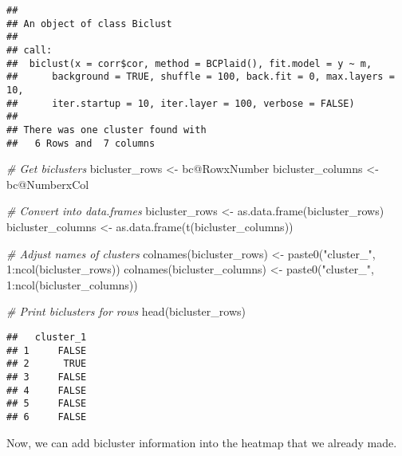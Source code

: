 \documentclass[
  oneside]{book}
\newenvironment{Shaded}{\begin{snugshade}}{\end{snugshade}}
\newcommand{\CommentTok}[1]{\textcolor[rgb]{0.56,0.35,0.01}{\textit{#1}}}
\newcommand{\DecValTok}[1]{\textcolor[rgb]{0.00,0.00,0.81}{#1}}
\newcommand{\FunctionTok}[1]{\textcolor[rgb]{0.00,0.00,0.00}{#1}}
\newcommand{\NormalTok}[1]{#1}
\newcommand{\OtherTok}[1]{\textcolor[rgb]{0.56,0.35,0.01}{#1}}
\newcommand{\SpecialCharTok}[1]{\textcolor[rgb]{0.00,0.00,0.00}{#1}}
\newcommand{\StringTok}[1]{\textcolor[rgb]{0.31,0.60,0.02}{#1}}
\begin{document}
\begin{verbatim}
## 
## An object of class Biclust 
## 
## call:
##  biclust(x = corr$cor, method = BCPlaid(), fit.model = y ~ m, 
##      background = TRUE, shuffle = 100, back.fit = 0, max.layers = 10, 
##      iter.startup = 10, iter.layer = 100, verbose = FALSE)
## 
## There was one cluster found with
##   6 Rows and  7 columns
\end{verbatim}

\begin{Shaded}
\begin{Highlighting}[]
\CommentTok{\# Get biclusters}
\NormalTok{bicluster\_rows }\OtherTok{\textless{}{-}}\NormalTok{ bc}\SpecialCharTok{@}\NormalTok{RowxNumber}
\NormalTok{bicluster\_columns }\OtherTok{\textless{}{-}}\NormalTok{ bc}\SpecialCharTok{@}\NormalTok{NumberxCol}

\CommentTok{\# Convert into data.frames}
\NormalTok{bicluster\_rows }\OtherTok{\textless{}{-}} \FunctionTok{as.data.frame}\NormalTok{(bicluster\_rows)}
\NormalTok{bicluster\_columns }\OtherTok{\textless{}{-}} \FunctionTok{as.data.frame}\NormalTok{(}\FunctionTok{t}\NormalTok{(bicluster\_columns))}

\CommentTok{\# Adjust names of clusters}
\FunctionTok{colnames}\NormalTok{(bicluster\_rows) }\OtherTok{\textless{}{-}} \FunctionTok{paste0}\NormalTok{(}\StringTok{"cluster\_"}\NormalTok{, }\DecValTok{1}\SpecialCharTok{:}\FunctionTok{ncol}\NormalTok{(bicluster\_rows))}
\FunctionTok{colnames}\NormalTok{(bicluster\_columns) }\OtherTok{\textless{}{-}} \FunctionTok{paste0}\NormalTok{(}\StringTok{"cluster\_"}\NormalTok{, }\DecValTok{1}\SpecialCharTok{:}\FunctionTok{ncol}\NormalTok{(bicluster\_columns))}

\CommentTok{\# Print biclusters for rows}
\FunctionTok{head}\NormalTok{(bicluster\_rows)}
\end{Highlighting}
\end{Shaded}

\begin{verbatim}
##   cluster_1
## 1     FALSE
## 2      TRUE
## 3     FALSE
## 4     FALSE
## 5     FALSE
## 6     FALSE
\end{verbatim}

Now, we can add bicluster information into the heatmap that we already made.
\end{document}
